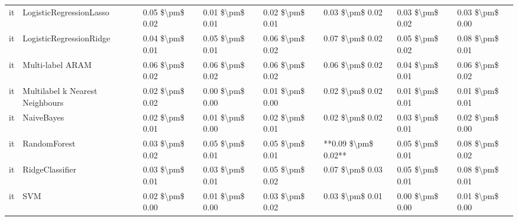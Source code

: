 \begin{tabular}{llllllll}
      it &         LogisticRegressionLasso & 0.05 \$\textbackslash pm\$ 0.02 &           0.01 \$\textbackslash pm\$ 0.01 &       0.02 \$\textbackslash pm\$ 0.01 &        0.03 \$\textbackslash pm\$ 0.02 &                         0.03 \$\textbackslash pm\$ 0.02 &     0.03 \$\textbackslash pm\$ 0.00 \\
      it &         LogisticRegressionRidge & 0.04 \$\textbackslash pm\$ 0.01 &           0.05 \$\textbackslash pm\$ 0.01 &       0.06 \$\textbackslash pm\$ 0.02 &        0.07 \$\textbackslash pm\$ 0.02 &                         0.05 \$\textbackslash pm\$ 0.02 &     0.08 \$\textbackslash pm\$ 0.01 \\
      it &                Multi-label ARAM & 0.06 \$\textbackslash pm\$ 0.02 &           0.06 \$\textbackslash pm\$ 0.02 &       0.06 \$\textbackslash pm\$ 0.02 &        0.06 \$\textbackslash pm\$ 0.02 &                         0.04 \$\textbackslash pm\$ 0.01 &     0.06 \$\textbackslash pm\$ 0.02 \\
      it & Multilabel k Nearest Neighbours & 0.02 \$\textbackslash pm\$ 0.02 &           0.00 \$\textbackslash pm\$ 0.00 &       0.01 \$\textbackslash pm\$ 0.00 &        0.02 \$\textbackslash pm\$ 0.02 &                         0.01 \$\textbackslash pm\$ 0.01 &     0.01 \$\textbackslash pm\$ 0.01 \\
      it &                      NaiveBayes & 0.02 \$\textbackslash pm\$ 0.01 &           0.01 \$\textbackslash pm\$ 0.00 &       0.02 \$\textbackslash pm\$ 0.01 &        0.02 \$\textbackslash pm\$ 0.02 &                         0.03 \$\textbackslash pm\$ 0.01 &     0.02 \$\textbackslash pm\$ 0.00 \\
      it &                    RandomForest & 0.03 \$\textbackslash pm\$ 0.02 &           0.05 \$\textbackslash pm\$ 0.01 &       0.05 \$\textbackslash pm\$ 0.01 &    **0.09 \$\textbackslash pm\$ 0.02** &                         0.05 \$\textbackslash pm\$ 0.01 &     0.08 \$\textbackslash pm\$ 0.02 \\
      it &                 RidgeClassifier & 0.03 \$\textbackslash pm\$ 0.01 &           0.03 \$\textbackslash pm\$ 0.01 &       0.05 \$\textbackslash pm\$ 0.02 &        0.07 \$\textbackslash pm\$ 0.03 &                         0.05 \$\textbackslash pm\$ 0.01 &     0.08 \$\textbackslash pm\$ 0.01 \\
      it &                             SVM & 0.02 \$\textbackslash pm\$ 0.00 &           0.01 \$\textbackslash pm\$ 0.00 &       0.03 \$\textbackslash pm\$ 0.02 &        0.03 \$\textbackslash pm\$ 0.01 &                         0.00 \$\textbackslash pm\$ 0.00 &     0.01 \$\textbackslash pm\$ 0.00 \\

\end{tabular}
